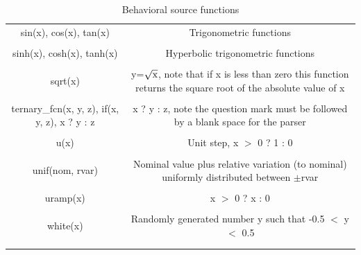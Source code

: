 \begin{longtable}{c c}
sin(x), cos(x), tan(x) & \begin{minipage}{20em}
Trigonometric functions
\end{minipage}\\ \\

sinh(x), cosh(x), tanh(x) & \begin{minipage}{20em}
Hyperbolic trigonometric functions
\end{minipage}\\ \\

sqrt(x) & \begin{minipage}{20em}
y=$\sqrt{\rm{x}}$, note that if x is less than zero this function returns the square root of the absolute value of x
\end{minipage}\\ \\


ternary\_fcn(x, y, z), if(x, y, z), x ? y : z & \begin{minipage}{20em}
x ? y : z, note the question mark must be followed by a blank space for the parser
\end{minipage}\\ \\

u(x) & \begin{minipage}{20em}
Unit step, x $>$ 0 ? 1 : 0
\end{minipage}\\ \\

unif(nom, rvar) & \begin{minipage}{20em}
Nominal value plus relative variation (to nominal) uniformly distributed between $\pm$rvar
\end{minipage}\\ \\

uramp(x) & \begin{minipage}{20em}
x $>$ 0 ? x : 0
\end{minipage}\\ \\

white(x) & \begin{minipage}{20em}
Randomly generated number y such that -0.5 $<$ y $<$ 0.5
\end{minipage}\\ \\[1ex] %
\hline %

\caption{Behavioral source functions}
\label {tab:paramfuncs}
\end{longtable}

